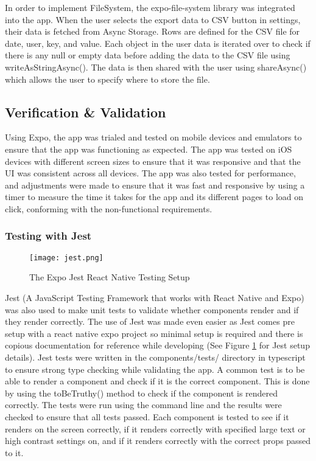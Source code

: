 In order to implement FileSystem, the expo-file-system library was integrated into the app. When the user selects the export data to CSV button in settings, their data is fetched from Async Storage. Rows are defined for the CSV file for date, user, key, and value. Each object in the user data is iterated over to check if there is any null or empty data before adding the data to the CSV file using writeAsStringAsync(). The data is then shared with the user using shareAsync() which allows the user to specify where to store the file.

\subsection{Verification \& Validation}
Using Expo, the app was trialed and tested on mobile devices and emulators to ensure that the app was functioning as expected. The app was tested on iOS devices with different screen sizes to ensure that it was responsive and that the UI was consistent across all devices. The app was also tested for performance, and adjustments were made to ensure that it was fast and responsive by using a timer to measure the time it takes for the app and its different pages to load on click, conforming with the non-functional requirements. 

\subsubsection{Testing with Jest}

\begin{figure}[h!!]
    \begin{center}
      \texttt{[image: jest.png]}
      \caption{The Expo Jest React Native Testing Setup\cite{LevelUp2025}}
      \label{figure:jest}
    \end{center}
  \end{figure}
  
Jest (A JavaScript Testing Framework that works with React Native and Expo) was also used to make unit tests to validate whether components render and if they render correctly. The use of Jest was made even easier as Jest comes pre setup with a react native expo project so minimal setup is required and there is copious documentation for reference while developing (See Figure \ref{figure:jest} for Jest setup details). Jest tests were written in the components/tests/ directory in typescript to ensure strong type checking while validating the app. A common test is to be able to render a component and check if it is the correct component. This is done by using the toBeTruthy() method to check if the component is rendered correctly. The tests were run using the command line and the results were checked to ensure that all tests passed. Each component is tested to see if it renders on the screen correctly, if it renders correctly with specified large text or high contrast settings on, and if it renders correctly with the correct props passed to it. 

